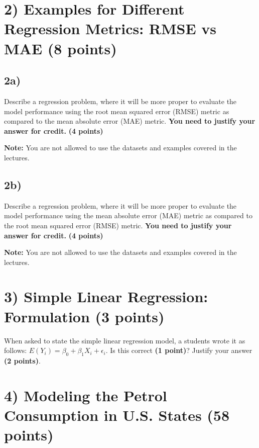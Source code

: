 \documentclass[
  letterpaper,
  DIV=11,
  numbers=noendperiod]{scrreprt}
\begin{document}
\section{2) Examples for Different Regression Metrics: RMSE vs MAE (8
points)}\label{examples-for-different-regression-metrics-rmse-vs-mae-8-points}

\subsection{2a)}\label{a-1}

Describe a regression problem, where it will be more proper to evaluate
the model performance using the root mean squared error (RMSE) metric as
compared to the mean absolute error (MAE) metric. \textbf{You need to
justify your answer for credit.} \textbf{(4 points)}

\textbf{Note:} You are not allowed to use the datasets and examples
covered in the lectures.

\subsection{2b)}\label{b-1}

Describe a regression problem, where it will be more proper to evaluate
the model performance using the mean absolute error (MAE) metric as
compared to the root mean squared error (RMSE) metric. \textbf{You need
to justify your answer for credit.} \textbf{(4 points)}

\textbf{Note:} You are not allowed to use the datasets and examples
covered in the lectures.

\section{3) Simple Linear Regression: Formulation (3
points)}\label{simple-linear-regression-formulation-3-points}

When asked to state the simple linear regression model, a students wrote
it as follows: \(E(Y_i) = \beta_0 + \beta_1X_i + \epsilon_i\). Is this
correct \textbf{(1 point)}? Justify your answer \textbf{(2 points)}.

\section{4) Modeling the Petrol Consumption in U.S. States (58
points)}\label{modeling-the-petrol-consumption-in-u.s.-states-58-points}
\end{document}
